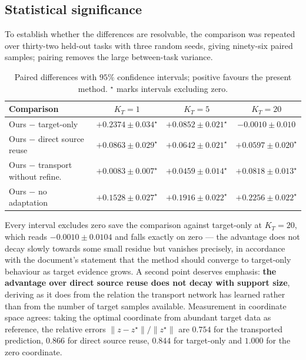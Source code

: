 \documentclass[11pt]{article}
\begin{document}
\subsection{Statistical significance}

To establish whether the differences are resolvable, the comparison was repeated over thirty-two
held-out tasks with three random seeds, giving ninety-six paired samples; pairing removes the large
between-task variance.

\begin{table}[htbp]
\centering\small
\begin{tabular}{@{}lccc@{}}
\toprule
\textbf{Comparison} & $K_T=1$ & $K_T=5$ & $K_T=20$ \\
\midrule
Ours $-$ target-only                & $+0.2374\pm0.034^{\star}$ & $+0.0852\pm0.021^{\star}$ & $-0.0010\pm0.010$ \\
Ours $-$ direct source reuse        & $+0.0863\pm0.029^{\star}$ & $+0.0642\pm0.021^{\star}$ & $+0.0597\pm0.020^{\star}$ \\
Ours $-$ transport without refine.  & $+0.0083\pm0.007^{\star}$ & $+0.0459\pm0.014^{\star}$ & $+0.0818\pm0.013^{\star}$ \\
Ours $-$ no adaptation              & $+0.1528\pm0.027^{\star}$ & $+0.1916\pm0.022^{\star}$ & $+0.2256\pm0.022^{\star}$ \\
\bottomrule
\end{tabular}
\caption{Paired differences with $95\%$ confidence intervals; positive favours the present method.
$^{\star}$ marks intervals excluding zero.}
\label{tab:ci}
\end{table}

Every interval excludes zero save the comparison against target-only at $K_T=20$, which reads
$-0.0010\pm0.0104$ and falls exactly on zero --- the advantage does not decay slowly towards some
small residue but vanishes precisely, in accordance with the document's statement that the method
should converge to target-only behaviour as target evidence grows. A second point deserves emphasis:
\textbf{the advantage over direct source reuse does not decay with support size}, deriving as it
does from the relation the transport network has learned rather than from the number of target
samples available. Measurement in coordinate space agrees: taking the optimal coordinate from
abundant target data as reference, the relative errors $\|z-z^\star\|/\|z^\star\|$ are $0.754$ for
the transported prediction, $0.866$ for direct source reuse, $0.844$ for target-only and $1.000$ for
the zero coordinate.
\end{document}
